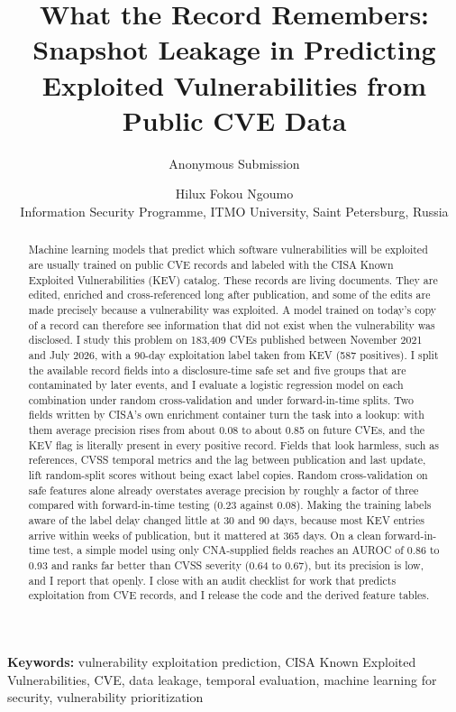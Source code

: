 \documentclass[11pt,a4paper]{article}
\title{What the Record Remembers: Snapshot Leakage in Predicting Exploited Vulnerabilities from Public CVE Data}
\author{Anonymous Submission}
\author{Hilux Fokou Ngoumo\\ \small Information Security Programme, ITMO University, Saint Petersburg, Russia}
\date{}
\begin{document}
\maketitle

\begin{abstract}
Machine learning models that predict which software vulnerabilities will be exploited are usually trained on public CVE records and labeled with the CISA Known Exploited Vulnerabilities (KEV) catalog. These records are living documents. They are edited, enriched and cross-referenced long after publication, and some of the edits are made precisely because a vulnerability was exploited. A model trained on today's copy of a record can therefore see information that did not exist when the vulnerability was disclosed. I study this problem on 183,409 CVEs published between November 2021 and July 2026, with a 90-day exploitation label taken from KEV (587 positives). I split the available record fields into a disclosure-time safe set and five groups that are contaminated by later events, and I evaluate a logistic regression model on each combination under random cross-validation and under forward-in-time splits. Two fields written by CISA's own enrichment container turn the task into a lookup: with them average precision rises from about 0.08 to about 0.85 on future CVEs, and the KEV flag is literally present in every positive record. Fields that look harmless, such as references, CVSS temporal metrics and the lag between publication and last update, lift random-split scores without being exact label copies. Random cross-validation on safe features alone already overstates average precision by roughly a factor of three compared with forward-in-time testing (0.23 against 0.08). Making the training labels aware of the label delay changed little at 30 and 90 days, because most KEV entries arrive within weeks of publication, but it mattered at 365 days. On a clean forward-in-time test, a simple model using only CNA-supplied fields reaches an AUROC of 0.86 to 0.93 and ranks far better than CVSS severity (0.64 to 0.67), but its precision is low, and I report that openly. I close with an audit checklist for work that predicts exploitation from CVE records, and I release the code and the derived feature tables.
\end{abstract}

\noindent\textbf{Keywords:} vulnerability exploitation prediction, CISA Known Exploited Vulnerabilities, CVE, data leakage, temporal evaluation, machine learning for security, vulnerability prioritization
\end{document}
